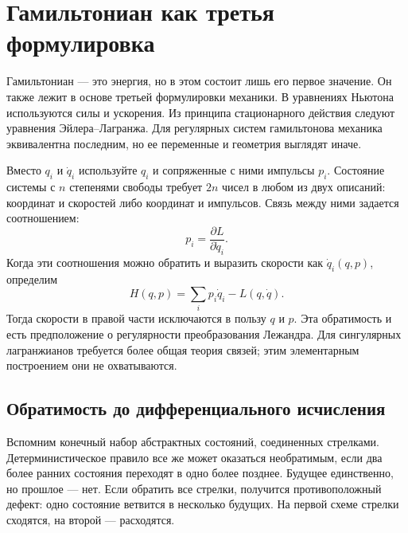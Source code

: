 \begin{classroomqa}   \end{classroomqa}

\section{Гамильтониан как третья формулировка}

Гамильтониан — это энергия, но в этом состоит лишь его первое значение. Он также лежит в основе третьей формулировки механики. В уравнениях Ньютона используются силы и ускорения. Из принципа стационарного действия следуют уравнения Эйлера--Лагранжа. Для регулярных систем гамильтонова механика эквивалентна последним, но ее переменные и геометрия выглядят иначе.

Вместо \(q_i\) и \(\dot q_i\) используйте \(q_i\) и сопряженные с ними импульсы \(p_i\). Состояние системы с \(n\) степенями свободы требует \(2n\) чисел в любом из двух описаний: координат и скоростей либо координат и импульсов. Связь между ними задается соотношением: \begin{equation}
  p_i=\frac{\partial L}{\partial\dot q_i}.
  \label{eq:l6-legendre-map}
\end{equation} Когда эти соотношения можно обратить и выразить скорости как \(\dot q_i(q,p)\), определим \begin{equation}
  H(q,p)=\sum_i p_i\dot q_i-L(q,\dot q).
  \label{eq:l6-hamiltonian-definition}
\end{equation} Тогда скорости в правой части исключаются в пользу \(q\) и \(p\). Эта обратимость и есть предположение о регулярности преобразования Лежандра. Для сингулярных лагранжианов требуется более общая теория связей; этим элементарным построением они не охватываются.

\subsection{Обратимость до дифференциального исчисления}

Вспомним конечный набор абстрактных состояний, соединенных стрелками. Детерминистическое правило все же может оказаться необратимым, если два более ранних состояния переходят в одно более позднее. Будущее единственно, но прошлое — нет. Если обратить все стрелки, получится противоположный дефект: одно состояние ветвится в несколько будущих. На первой схеме стрелки сходятся, на второй — расходятся.

